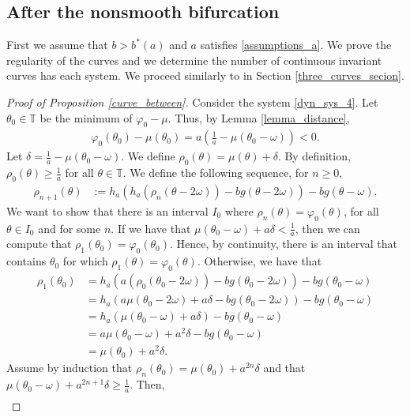 \documentclass[12pt]{article}
\newcommand{\T}{\mathbb{T}}
\theoremstyle{plain}
\theoremstyle{remark}
\theoremstyle{definition}
\begin{document}
\subsection{After the nonsmooth bifurcation}\label{sect_after}
First we assume that $b>b^*(a)$ and $a$ satisfies \eqref{assumptions_a}. We prove the regularity of the curves and we determine the number of continuous invariant curves has each system. We proceed similarly to in Section \ref{three_curves_secion}.
\begin{proof}[Proof of Proposition \ref{curve_between}]
    Consider the system \eqref{dyn_sys_4}. 
    Let $\theta_0\in\T$ be the minimum of $\varphi_0-\mu$. Thus, by Lemma \ref{lemma_distance},
    \begin{align*}
        \varphi_0(\theta_0)-\mu(\theta_0) = a\left(\frac{1}{a}-\mu(\theta_0-\omega)\right)<0.
    \end{align*}
    Let $\delta=\frac{1}{a}-\mu(\theta_0-\omega)$. We define $\rho_0(\theta) = \mu(\theta)+\delta$. By definition, $\rho_0(\theta)\geq\frac{1}{a}$ for all $\theta\in\T$. We define the following sequence, for $n\geq0$,
    \begin{align*}
        \rho_{n+1}(\theta) &:= h_a(h_{a}(\rho_n(\theta-2\omega)) - b g(\theta-2\omega)) - b g(\theta-\omega).
    \end{align*}
    We want to show that there is an interval $I_0$ where $\rho_n(\theta)=\varphi_0(\theta)$, for all $\theta\in I_0$ and for some $n$.
    If we have that $\mu(\theta_0-\omega) + a\delta < \frac{1}{a}$, then we can compute that $\rho_{1}(\theta_0) = \varphi_0(\theta_0)$. Hence, by continuity, there is an interval that contains $\theta_0$ for which $\rho_{1}(\theta) = \varphi_0(\theta)$. Otherwise, we have that 
    \begin{align*}
        \rho_{1}(\theta_0) &= h_a(a(\rho_0(\theta_0-2\omega)) - b g(\theta_0-2\omega)) - b g(\theta_0-\omega)\\
        &= h_a(a\mu(\theta_0-2\omega) + a\delta - b g(\theta_0-2\omega)) - b g(\theta_0-\omega)\\
        &= h_a(\mu(\theta_0-\omega) +a\delta) - b g(\theta_0-\omega)\\
        &= a\mu(\theta_0-\omega) + a^2\delta - b g(\theta_0-\omega)\\
        &= \mu(\theta_0) + a^2\delta.
    \end{align*}
    Assume by induction that $\rho_n(\theta_0)=\mu(\theta_0)+a^{2n}\delta$ and that $\mu(\theta_0-\omega) + a^{2n+1}\delta \geq \frac{1}{a}$. Then, 
    \begin{align}

\end{align}
\end{proof}
\end{document}
